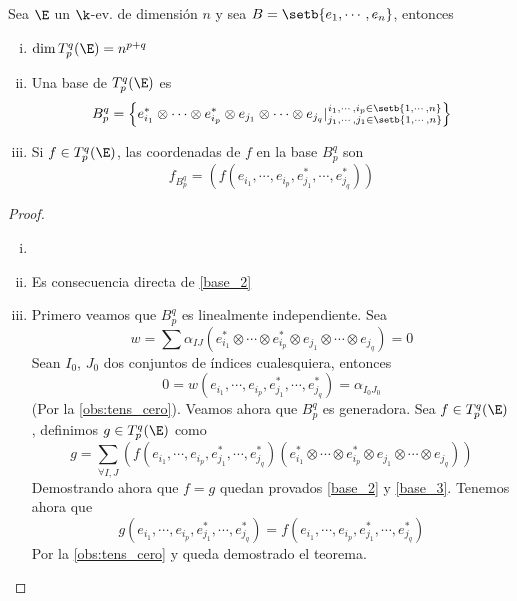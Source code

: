 \begin{teo}[de la base de $T_p^q(\E)$]
    Sea $ \E $ un $ \k $-ev.  de dimensión $ n $ y sea $ B = \setb{e_1,
    \cdots, e_n} $, entonces
    \begin{enumerate}[i)]
    \item
        $ \dim T_p^q(\E) = n^{p+q} $
    \item
        \label{base_2} Una base de $ T_p^q(\E) $ es
        \[
            B_p^q = \left\{ e_{i_1}^* \otimes \cdots \otimes e_{i_p}^*
            \otimes e_{j_1} \otimes \cdots \otimes e_{j_q} \vert
            \substack{i_1, \cdots, i_p \in \setb{1,\cdots,n} \\
            j_1, \cdots, j_1 \in \setb{1,\cdots,n}} \right\}
        \]
    \item
        \label{base_3} Si $ f \in T_p^q(\E) $, las coordenadas de $ f $
        en la base $ B_p^q $ son
        \[
            f_{B_p^q} = (f(e_{i_1}, \cdots, e_{i_p}, e_{j_1}^*, \cdots,
            e_{j_q}^*))
        \]
\end{enumerate}
\end{teo}
\begin{proof}
    \begin{enumerate}[i)]
    \item[]
    \item
        Es consecuencia directa de%
        \ref{base_2}
    \item
        Primero veamos que $ B_p^q $ es linealmente independiente.  Sea
        \[
            w = \sum \alpha_{IJ}(e_{i_1}^* \otimes \cdots \otimes e_{i_p}^*
            \otimes e_{j_1} \otimes \cdots \otimes e_{j_q}) = 0
        \]
        Sean $ I_0 $, $ J_0 $ dos conjuntos de índices cualesquiera,
        entonces
        \[
            0 = w(e_{i_1}, \cdots, e_{i_p}, e_{j_1}^*, \cdots, e_{j_q}^*)
            = \alpha_{I_0J_0}
        \]
        (Por la%
        \ref{obs:tens_cero}).  Veamos ahora que $ B_p^q $ es generadora.
        Sea $ f \in T_p^q(\E) $, definimos $ g \in T_p^q(\E) $ como
        \[
            g = \sum_{\forall I,J} (f(e_{i_1}, \cdots, e_{i_p}, e_{j_1}^*,
            \cdots, e_{j_q}^*)(e_{i_1}^* \otimes \cdots \otimes e_{i_p}^*
            \otimes e_{j_1} \otimes \cdots \otimes e_{j_q}))
        \]
        Demostrando ahora que $ f=g $ quedan provados%
        \ref{base_2} y%
        \ref{base_3}. Tenemos ahora que
        \[
            g(e_{i_1}, \cdots, e_{i_p}, e_{j_1}^*, \cdots, e_{j_q}^*) =
            f(e_{i_1}, \cdots, e_{i_p}, e_{j_1}^*, \cdots, e_{j_q}^*)
        \]
        Por la%
        \ref{obs:tens_cero} y queda demostrado el teorema.
\end{enumerate}
\end{proof}
